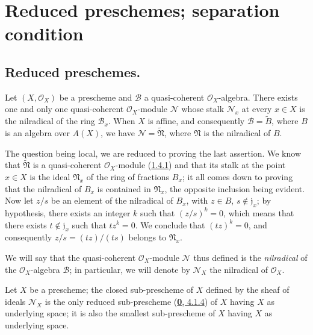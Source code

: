 \section{Reduced preschemes; separation condition}
\label{section:I.5}

\subsection{Reduced preschemes.}
\label{subsection:I.5.1}

\begin{proposition}[5.1.1]
\label{I.5.1.1}
Let $(X,\mathscr{O}_X)$ be a prescheme and $\mathscr{B}$ a quasi-coherent
$\mathscr{O}_X$-algebra. There exists one and only one quasi-coherent
$\mathscr{O}_X$-module $\mathscr{N}$ whose stalk
$\mathscr{N}_x$ at every $x\in X$ is the nilradical of the ring
$\mathscr{B}_x$. When $X$ is affine, and consequently
$\mathscr{B}=\widetilde{B}$, where $B$ is an algebra over $A(X)$, we have
$\mathscr{N}=\widetilde{\mathfrak{N}}$, where $\mathfrak{N}$ is the nilradical
of $B$.
\end{proposition}

The question being local, we are reduced to proving the last assertion. We
know that $\widetilde{\mathfrak{N}}$ is a quasi-coherent $\mathscr{O}_X$-module
(\hyperref[I.1.4.1]{1.4.1}) and that its stalk at the point
$x\in X$ is the ideal $\mathfrak{N}_x$ of the ring of fractions $B_x$; it all
comes down to proving that the nilradical of $B_x$ is contained in
$\mathfrak{N}_x$, the opposite inclusion being evident. Now let $z/s$ be an
element of the nilradical of $B_x$, with $z\in B$, $s\notin\mathfrak{j}_x$; by
hypothesis, there exists an integer $k$ such that $(z/s)^k=0$, which means
that there exists $t\notin\mathfrak{j}_x$ such that $tz^k=0$. We conclude that
$(tz)^k=0$, and consequently $z/s=(tz)/(ts)$ belongs to $\mathfrak{N}_x$.

We will say that the quasi-coherent $\mathscr{O}_X$-module $\mathscr{N}$ thus
defined is the \emph{nilradical} of the $\mathscr{O}_X$-algebra $\mathscr{B}$;
in particular, we will denote by $\mathscr{N}_X$ the nilradical of
$\mathscr{O}_X$.

\begin{corollary}[5.1.2]
\label{I.5.1.2}
Let $X$ be a prescheme; the closed sub-prescheme of $X$ defined by the sheaf
of ideals $\mathscr{N}_X$ is the only reduced sub-prescheme
\textup{(\hyperref[0.4.1.4]{\textbf{0}, 4.1.4})} of $X$ having $X$ as underlying space;
it is also the smallest sub-prescheme of $X$ having $X$ as underlying
space.
\end{corollary}

